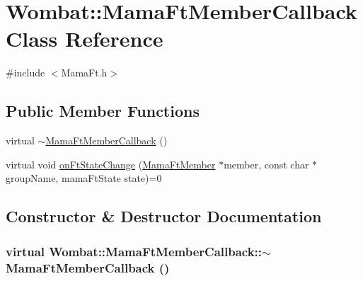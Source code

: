 \hypertarget{classWombat_1_1MamaFtMemberCallback}{
\section{Wombat::MamaFtMemberCallback Class Reference}
\label{classWombat_1_1MamaFtMemberCallback}
}


{\ttfamily \#include $<$MamaFt.h$>$}\subsection*{Public Member Functions}
\begin{DoxyCompactItemize}
\item 
virtual \hyperlink{classWombat_1_1MamaFtMemberCallback_a6851e6fe8cbfad533e92259de06bffe9}{$\sim$MamaFtMemberCallback} ()
\item 
virtual void \hyperlink{classWombat_1_1MamaFtMemberCallback_a41a9fdaf6c234ab776f48a2ca2553de9}{onFtStateChange} (\hyperlink{classWombat_1_1MamaFtMember}{MamaFtMember} $\ast$member, const char $\ast$groupName, mamaFtState state)=0
\end{DoxyCompactItemize}


\subsection{Constructor \& Destructor Documentation}
\hypertarget{classWombat_1_1MamaFtMemberCallback_a6851e6fe8cbfad533e92259de06bffe9}{
\subsubsection[{$\sim$MamaFtMemberCallback}]{\setlength{\rightskip}{0pt plus 5cm}virtual Wombat::MamaFtMemberCallback::$\sim$MamaFtMemberCallback ()}}
\label{classWombat_1_1MamaFtMemberCallback_a6851e6fe8cbfad533e92259de06bffe9}


